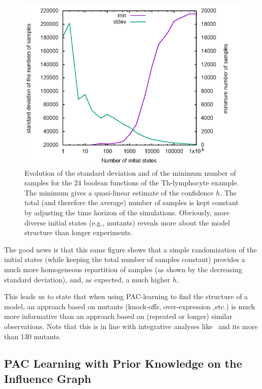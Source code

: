 \documentclass{llncs}
\newif\ifcomments%
\newcommand{\sylvain}[1]{\ifcomments\textcolor{green}{#1}\fi}
\begin{document}
\begin{figure}[htb]
   \includegraphics[width=\textwidth]{statistics/statistics.png}
   \caption{Evolution of the standard deviation and of the minimum number of
   samples for the 24 boolean functions of the Th-lymphocyte example. The
minimum gives a quasi-linear estimate of the confidence $h$. The total (and
therefore the average) number of samples is kept constant by adjusting the
time horizon of the simulations. Obviously, more diverse initial states (e.g.,
mutants) reveals more about the model structure than longer experiments.}%
\label{fig:statistics}
\end{figure}

The good news is that this same figure shows that a simple randomization of
the initial states (while keeping the total number of samples constant)
provides a much more homogeneous repartition of samples (as shown by the
decreasing standard deviation), and, as expected, a much higher $h$.

This leads us to state that when using PAC-learning to find the structure of a
model, an approach based on mutants (knock-offs, over-expression ,etc.) is
much more informative than an approach based on (repeated or longer) similar
observations. Note that this is in line with integrative analyses
like~\cite{CCCCNT04mbc} and its more than 130 mutants.

\sylvain{add something about model quality}

\subsection{PAC Learning with Prior Knowledge on the Influence Graph}
\label{sec:prior}
\end{document}

